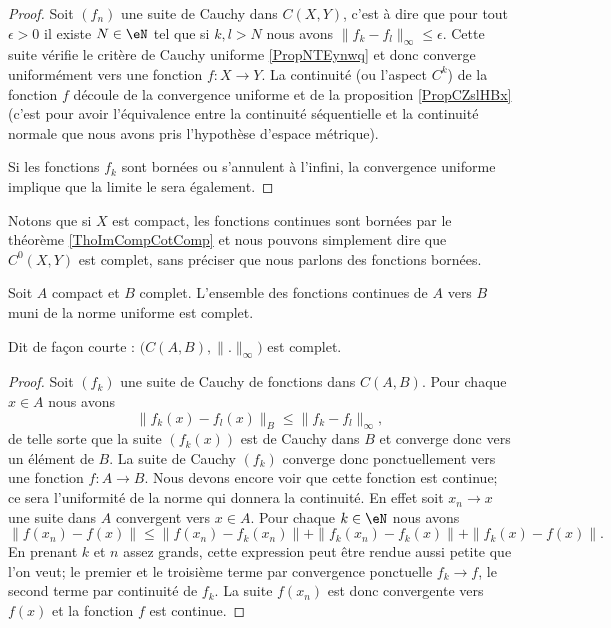 \begin{proof}
    Soit \( (f_n)\) une suite de Cauchy dans \( C(X,Y)\), c'est à dire que pour tout \( \epsilon>0\) il existe \( N\in \eN\) tel que si \( k,l>N\) nous avons \( \| f_k-f_l \|_{\infty}\leq \epsilon\). Cette suite vérifie le critère de Cauchy uniforme \ref{PropNTEynwq} et donc converge uniformément vers une fonction \( f\colon X\to Y\). La continuité (ou l'aspect \( C^k\)) de la fonction \( f\) découle de la convergence uniforme et de la proposition \ref{PropCZslHBx} (c'est pour avoir l'équivalence entre la continuité séquentielle et la continuité normale que nous avons pris l'hypothèse d'espace métrique).

    Si les fonctions \( f_k\) sont bornées ou s'annulent à l'infini, la convergence uniforme implique que la limite le sera également.
\end{proof}
    Notons que si \( X\) est compact, les fonctions continues sont bornées par le théorème \ref{ThoImCompCotComp} et nous pouvons simplement dire que \( C^0(X,Y)\) est complet, sans préciser que nous parlons des fonctions bornées.


\begin{lemma}       \label{LemdLKKnd}
    Soit \( A\) compact et \( B\) complet. L'ensemble des fonctions continues de \( A\) vers \( B\) muni de la norme uniforme est complet.

    Dit de façon courte : \( \big( C(A,B),\| . \|_{\infty} \big)\) est complet.
\end{lemma}

\begin{proof}
    Soit \( (f_k)\) une suite de Cauchy de fonctions dans \( C(A,B)\). Pour chaque \( x\in A \) nous avons
    \begin{equation}
        \| f_k(x)-f_l(x) \|_B\leq \| f_k-f_l \|_{\infty},
    \end{equation}
    de telle sorte que la suite \( (f_k(x))\) est de Cauchy dans \( B\) et converge donc vers un élément de \( B\). La suite de Cauchy \( (f_k)\) converge donc ponctuellement vers une fonction \( f\colon A\to B\). Nous devons encore voir que cette fonction est continue; ce sera l'uniformité de la norme qui donnera la continuité. En effet soit \( x_n\to x\) une suite dans \( A\) convergent vers \( x\in A\). Pour chaque \( k\in \eN\) nous avons
    \begin{equation}
        \| f(x_n)-f(x) \|\leq \| f(x_n)-f_k(x_n) \|  +\| f_k(x_n)-f_k(x) \|+\| f_k(x)-f(x) \|.
    \end{equation}
    En prenant \( k\) et \( n\) assez grands, cette expression peut être rendue aussi petite que l'on veut; le premier et le troisième terme par convergence ponctuelle \( f_k\to f\), le second terme par continuité de \( f_k\). La suite \( f(x_n)\) est donc convergente vers \( f(x)\) et la fonction \( f\) est continue.
\end{proof}

